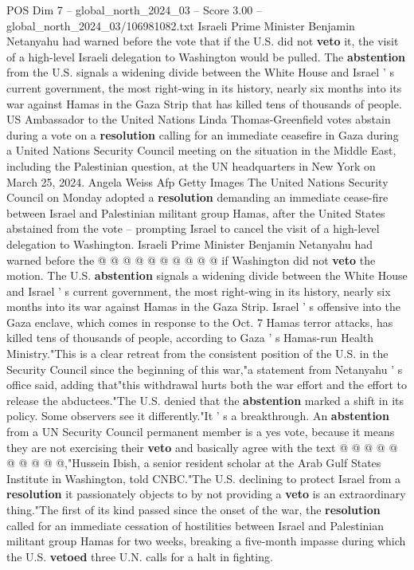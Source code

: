 \begin{textsample}{POS Dim 7 – global\_north\_2024\_03 – Score 3.00 – global\_north\_2024\_03/106981082.txt}  \label{ex:f7_pos_214}
Israeli Prime Minister Benjamin Netanyahu had warned before the vote that if the U.S. did not \textbf{veto} it, the visit of a high-level Israeli delegation to Washington would be pulled.
The \textbf{abstention} from the U.S. signals a widening divide between the White House and Israel ' s current government, the most right-wing in its history, nearly six months into its war against Hamas in the Gaza Strip that has killed tens of thousands of people.
US Ambassador to the United Nations Linda Thomas-Greenfield votes abstain during a vote on a \textbf{resolution} calling for an immediate ceasefire in Gaza during a United Nations Security Council meeting on the situation in the Middle East, including the Palestinian question, at the UN headquarters in New York on March 25, 2024.
Angela Weiss Afp Getty Images The United Nations Security Council on Monday adopted a \textbf{resolution} demanding an immediate cease-fire between Israel and Palestinian militant group Hamas, after the United States abstained from the vote -- prompting Israel to cancel the visit of a high-level delegation to Washington.
Israeli Prime Minister Benjamin Netanyahu had warned before the @ @ @ @ @ @ @ @ @ @ if Washington did not \textbf{veto} the motion.
The U.S. \textbf{abstention} signals a widening divide between the White House and Israel ' s current government, the most right-wing in its history, nearly six months into its war against Hamas in the Gaza Strip.
Israel ' s offensive into the Gaza enclave, which comes in response to the Oct. 7 Hamas terror attacks, has killed tens of thousands of people, according to Gaza ' s Hamas-run Health Ministry."This is a clear retreat from the consistent position of the U.S. in the Security Council since the beginning of this war,"a statement from Netanyahu ' s office said, adding that"this withdrawal hurts both the war effort and the effort to release the abductees."The U.S. denied that the \textbf{abstention} marked a shift in its policy.
Some observers see it differently."It ' s a breakthrough.
An \textbf{abstention} from a UN Security Council permanent member is a yes vote, because it means they are not exercising their \textbf{veto} and basically agree with the text @ @ @ @ @ @ @ @ @ @,"Hussein Ibish, a senior resident scholar at the Arab Gulf States Institute in Washington, told CNBC."The U.S. declining to protect Israel from a \textbf{resolution} it passionately objects to by not providing a \textbf{veto} is an extraordinary thing."The first of its kind passed since the onset of the war, the \textbf{resolution} called for an immediate cessation of hostilities between Israel and Palestinian militant group Hamas for two weeks, breaking a five-month impasse during which the U.S. \textbf{vetoed} three U.N. calls for a halt in fighting.

\end{textsample}
